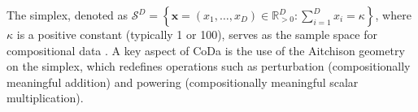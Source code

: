 \documentclass[
	12pt,				%
	oneside,			%
	a4paper,			%
	english,			%
	brazil				%
	]{abntex2ppgsi}
\begin{document}
The simplex, denoted as $\mathcal{S}^D = \left\{ \mathbf{x} = (x_1, \ldots, x_D) \in \mathbb{R}^D_{>0} : \sum_{i=1}^D x_i = \kappa \right\}$, where $\kappa$ is a positive constant (typically 1 or 100), serves as the sample space for compositional data \cite{egozcue2003isometric}. A key aspect of CoDa is the use of the Aitchison geometry on the simplex, which redefines operations such as perturbation (compositionally meaningful addition) and powering (compositionally meaningful scalar multiplication).







\end{document}
